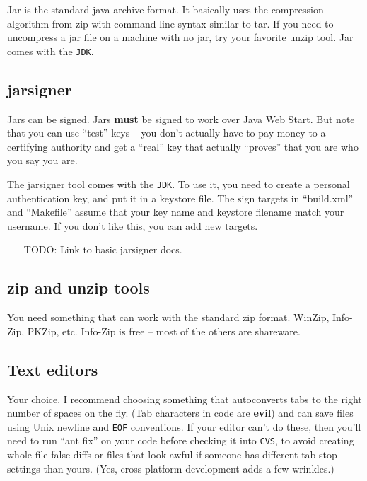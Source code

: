 \documentclass{article}
\begin{document}
Jar is the standard java archive format. It basically uses the compression 
algorithm from zip with command line syntax similar to tar. If you need to 
uncompress a jar file on a machine with no jar, try your favorite unzip tool. 
Jar comes with the \texttt{JDK}.

\subsection{jarsigner}

Jars can be signed. Jars \textbf{must} be signed to work over Java Web Start.
But note that you can use ``test'' keys -- you don't actually have to
pay money to a certifying authority and get a ``real'' key that actually
``proves'' that you are who you say you are.

The jarsigner tool comes with the \texttt{JDK}. To use it, you need to create
a personal authentication key, and put it in a keystore file. The sign
targets in ``build.xml'' and ``Makefile'' assume that your key name and
keystore filename match your username. If you don't like this, you can
add new targets.

\begin{itemize}
\item[TODO:] Link to basic jarsigner docs.
\end{itemize}

\subsection{zip and unzip tools}

You need something that can work with the standard zip format. WinZip, 
Info-Zip, PKZip, etc. Info-Zip is free -- most of the others are
shareware. 

\subsection{Text editors}

Your choice. I recommend choosing something that autoconverts tabs to
the right number of spaces on the fly. (Tab characters in code are
\textbf{evil}) and can save files using Unix newline and \texttt{EOF}
conventions. If your editor can't do these, then you'll need to run
``ant fix'' on your code before checking it into \texttt{CVS}, to avoid
creating whole-file false diffs or files that look awful if someone has
different tab stop settings than yours. (Yes, cross-platform development
adds a few wrinkles.)
\end{document}
